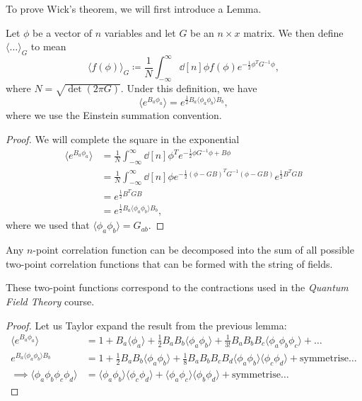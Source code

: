To prove Wick's theorem, we will first introduce a Lemma.
\begin{lemma}
  Let $\phi$ be a vector of $n$ variables and let $G$ be an $n \times x$ matrix. We then define $\langle \dots \rangle_G$ to mean
  \begin{equation}
    \langle f(\phi) \rangle_G \coloneqq \frac{1}{N} \int_{-\infty}^{\infty}  \dd[n]{\phi} f(\phi) e^{-\frac{1}{2} \phi^T G ^{-1} \phi},
  \end{equation}
  where $N = \sqrt{\det(2\pi G)}$.
  Under this definition, we have
  \begin{equation}
    \langle e^{B_a \phi_a} \rangle = e^{\frac{1}{2} B_a \langle \phi_a \phi_b \rangle B_b},
  \end{equation}
  where we use the Einstein summation convention.
\end{lemma}
\begin{proof}
  We will complete the square in the exponential
  \begin{align}
    \langle e^{B_a \phi_a} \rangle &= \frac{1}{N} \int_{-\infty}^{\infty}  \dd[n]{\phi}^T e^{-\frac{1}{2} \phi G^{-1} \phi + B \phi} \\
				   &= \frac{1}{N} \int_{-\infty}^{\infty}  \dd[n]{\phi} e^{-\frac{1}{2} (\phi - G B)^T G^{-1} (\phi - G B)} e^{\frac{1}{2} B^T G B} \\
				   &= e^{\frac{1}{2} B^T G B} \\
				   &= e^{\frac{1}{2} B_a \langle \phi_a \phi_b \rangle B_b},
  \end{align}
  where we used that $\langle \phi_a \phi_b \rangle = G_{ab}$.
\end{proof}
\begin{theorem}
  Any $n$-point correlation function can be decomposed into the sum of all possible two-point correlation functions that can be formed with the string of fields.
\end{theorem}
\begin{leftbar}
  \begin{remark}
    These two-point functions correspond to the contractions used in the \emph{Quantum Field Theory} course.
  \end{remark}
\end{leftbar}
\begin{proof}
  Let us Taylor expand the result from the previous lemma:
  \begin{align}
    \langle e^{B_a \phi_a} \rangle &= 1 + B_a \langle \phi_a \rangle + \frac{1}{2} B_a B_b \langle \phi_a \phi_b \rangle + \frac{1}{3!} B_a B_b B_c \langle \phi_a \phi_b \phi_c \rangle + \dots \\
    e^{B_a \langle \phi_a \phi_b \rangle B_b} &= 1 + \frac{1}{2} B_a B_b \langle \phi_a \phi_b \rangle + \frac{1}{8} B_a B_b B_c B_d \langle \phi_a \phi_b \rangle \langle \phi_c \phi_d \rangle + \text{symmetrise} \dots \\
    \implies \langle \phi_a \phi_b \phi_c \phi_d \rangle &= \langle \phi_a \phi_b \rangle \langle \phi_c \phi_d \rangle + \langle \phi_a \phi_c \rangle \langle \phi_b \phi_d \rangle + \text{symmetrise} \dots
    \label{eq:11-wick}
  \end{align}
\end{proof}
